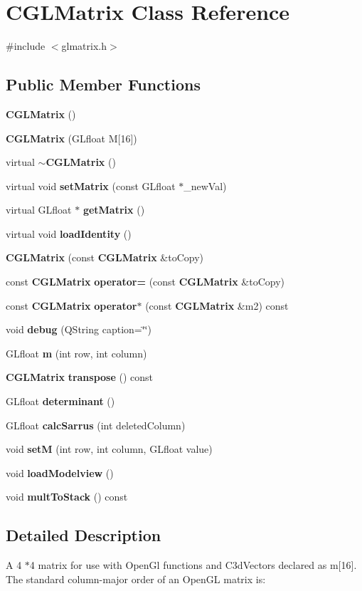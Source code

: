 \section{\-C\-G\-L\-Matrix \-Class \-Reference}
\label{d2/dbf/classCGLMatrix}


{\ttfamily \#include $<$glmatrix.\-h$>$}

\subsection*{\-Public \-Member \-Functions}
\begin{DoxyCompactItemize}
\item 
{\bf \-C\-G\-L\-Matrix} ()
\item 
{\bf \-C\-G\-L\-Matrix} (\-G\-Lfloat \-M[16])
\item 
virtual {\bf $\sim$\-C\-G\-L\-Matrix} ()
\item 
virtual void {\bf set\-Matrix} (const \-G\-Lfloat $\ast$\-\_\-new\-Val)
\item 
virtual \-G\-Lfloat $\ast$ {\bf get\-Matrix} ()
\item 
virtual void {\bf load\-Identity} ()
\item 
{\bf \-C\-G\-L\-Matrix} (const {\bf \-C\-G\-L\-Matrix} \&to\-Copy)
\item 
const {\bf \-C\-G\-L\-Matrix} {\bf operator=} (const {\bf \-C\-G\-L\-Matrix} \&to\-Copy)
\item 
const {\bf \-C\-G\-L\-Matrix} {\bf operator$\ast$} (const {\bf \-C\-G\-L\-Matrix} \&m2) const 
\item 
void {\bf debug} (\-Q\-String caption=\char`\"{}\char`\"{})
\item 
\-G\-Lfloat {\bf m} (int row, int column)
\item 
{\bf \-C\-G\-L\-Matrix} {\bf transpose} () const 
\item 
\-G\-Lfloat {\bf determinant} ()
\item 
\-G\-Lfloat {\bf calc\-Sarrus} (int deleted\-Column)
\item 
void {\bf set\-M} (int row, int column, \-G\-Lfloat value)
\item 
void {\bf load\-Modelview} ()
\item 
void {\bf mult\-To\-Stack} () const 
\end{DoxyCompactItemize}


\subsection{\-Detailed \-Description}
\-A 4 $\ast$4 matrix for use with \-Open\-Gl functions and \-C3d\-Vectors declared as m[16]. \-The standard column-\/major order of an \-Open\-G\-L matrix is\-:

